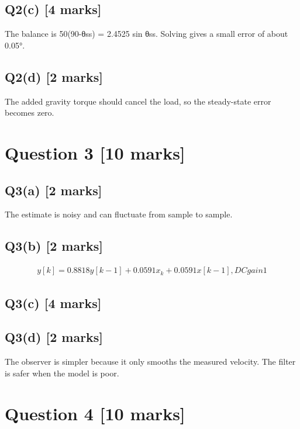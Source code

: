 \documentclass[11pt,a4paper]{article}
\begin{document}
\subsection*{Q2(c) \hfill [4 marks]}

The balance is 50(90-θss) = 2.4525 sin θss.
Solving gives a small error of about 0.05°.

\subsection*{Q2(d) \hfill [2 marks]}

The added gravity torque should cancel the load, so the steady-state error becomes zero. 
\section*{Question 3 \hfill [10 marks]}
\subsection*{Q3(a) \hfill [2 marks]}

The estimate is noisy and can fluctuate from sample to sample.

\subsection*{Q3(b) \hfill [2 marks]}

\[\begin{aligned}y[k]=0.8818y[k-1]+0.0591x_k+0.0591x[k-1], DC gain 1\end{aligned}\]

\subsection*{Q3(c) \hfill [4 marks]}

\vspace{2mm}

\subsection*{Q3(d) \hfill [2 marks]}

The observer is simpler because it only smooths the measured velocity.
The filter is safer when the model is poor.

\section*{Question 4 \hfill [10 marks]}
\end{document}
